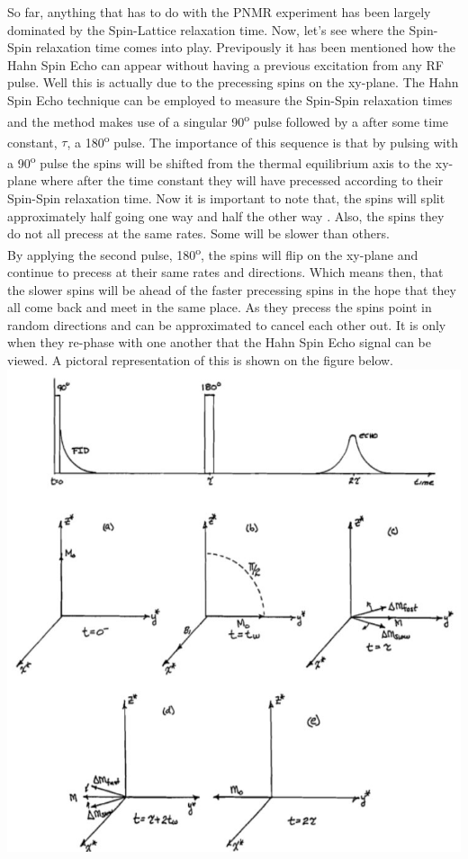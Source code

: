 \documentclass{article}
\begin{document}
{\begin{multicols}{2}
\label{fig:4}
\justify
So far, anything that has to do with the PNMR experiment has been largely 
dominated by the Spin-Lattice relaxation time. Now, let's see where the 
Spin-Spin relaxation time comes into play. Previpously it has been mentioned 
how the Hahn Spin Echo can appear without having a previous excitation from any 
RF pulse. Well this is actually due to the precessing spins on the xy-plane. 
The Hahn Spin Echo technique can be employed to measure the Spin-Spin 
relaxation times and the method makes use of a singular 90\textsuperscript{o} 
pulse followed by a after some time constant, $\tau$, a 180\textsuperscript{o} 
pulse. The importance of this sequence is that by pulsing with a 
90\textsuperscript{o} pulse the spins will be shifted from the thermal 
equilibrium axis to the 
xy-plane where after the time constant they will have precessed according to 
their Spin-Spin relaxation time. Now it is important to note that, the spins 
will split approximately half going one way and half the other way 
\cite{ref:1}. Also, the spins they do not all precess at the same rates. Some 
will be slower than others.
\\
By applying the second pulse, 180\textsuperscript{o}, the spins will flip on 
the xy-plane and continue to precess at their same rates and directions. Which 
means then, that the slower spins will be ahead of the faster precessing spins 
in the hope that they all come back and meet in the same place. As they precess 
the spins point in random directions and can be approximated to cancel each 
other out. It is only when they re-phase with one another that the Hahn Spin 
Echo signal can be viewed. A pictoral representation of this is shown on the 
figure below.
\center
\includegraphics[width=\linewidth]{pic-de-manual/giro-de-momenta-angular.jpg}

\end{multicols}}
\end{document}
